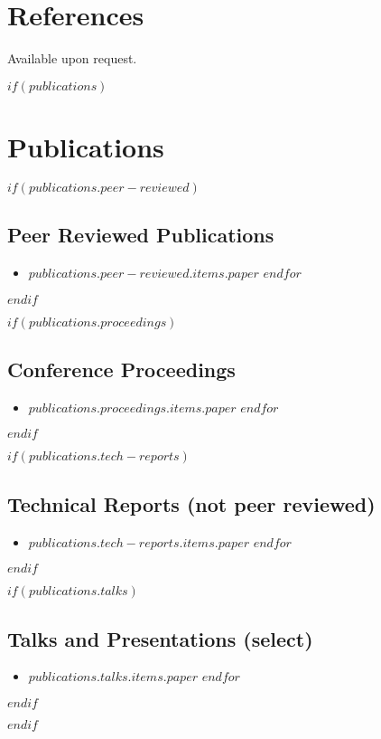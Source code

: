 \documentclass[letterpaper,10pt,final]{moderncv}
\begin{document}
\section{References}
Available upon request.

$if(publications)$
\section{Publications}
$if(publications.peer-reviewed)$
\subsection{Peer Reviewed Publications}
\begin{itemize}
$for(publications.peer-reviewed.items)$
\item $publications.peer-reviewed.items.paper$
$endfor$
\end{itemize}
$endif$

$if(publications.proceedings)$
\subsection{Conference Proceedings}
\begin{itemize}
$for(publications.proceedings.items)$
\item $publications.proceedings.items.paper$
$endfor$
\end{itemize}
$endif$

$if(publications.tech-reports)$
\subsection{Technical Reports (not peer reviewed)}
\begin{itemize}
$for(publications.tech-reports.items)$
\item $publications.tech-reports.items.paper$
$endfor$
\end{itemize}
$endif$

$if(publications.talks)$
\subsection{Talks and Presentations (select)}
\begin{itemize}
$for(publications.talks.items)$
\item $publications.talks.items.paper$
$endfor$
\end{itemize}
$endif$

$endif$


\end{document}
